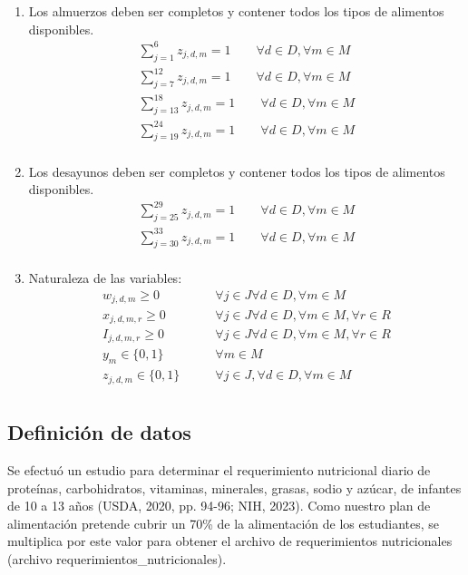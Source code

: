 \documentclass[letterpaper]{article}
\begin{document}
\begin{enumerate}
\begin{equation*}
        \end{equation*}
    \item Los almuerzos deben ser completos y contener todos los tipos de alimentos disponibles.
        \begin{align*}
            \sum_{j = 1}^{6} z_{j,d,m} = 1 \qquad \forall d \in D, \forall m \in M \\
             \sum_{j = 7}^{12} z_{j,d,m} = 1 \qquad \forall d \in D, \forall m \in M \\
              \sum_{j = 13}^{18} z_{j,d,m} = 1 \qquad \forall d \in D, \forall m \in M \\
              \sum_{j = 19}^{24} z_{j,d,m} = 1 \qquad \forall d \in D, \forall m \in M \\
        \end{align*}
    \item Los desayunos deben ser completos y contener todos los tipos de alimentos disponibles.
        \begin{align*}
            \sum_{j = 25}^{29} z_{j,d,m} = 1 \qquad \forall d \in D, \forall m \in M \\
            \sum_{j = 30}^{33} z_{j,d,m} = 1  \qquad \forall d \in D, \forall m \in M \\
        \end{align*}
    \item Naturaleza de las variables:
        \begin{align*}
            w_{j,d,m} \geq 0 &\qquad \forall j \in J \forall d \in D, \forall m \in M \\
            x_{j,d,m,r} \geq 0 &\qquad \forall j \in J \forall d \in D, \forall m \in M, \forall r \in R  \\
            I_{j,d,m,r} \geq 0 &\qquad \forall j \in J \forall d \in D, \forall m \in M, \forall r \in R  \\
            y_{m} \in \{0,1\} &\qquad \forall m \in M  \\
            z_{j,d,m} \in \{0,1\} &\qquad \forall j \in J, \forall d \in D, \forall m \in M \\
        \end{align*}
\end{enumerate}

    \subsection{Definición de datos}
    Se efectuó un estudio para determinar el requerimiento nutricional diario de proteínas, carbohidratos, vitaminas, minerales, grasas, sodio y azúcar, de infantes de 10 a 13 años (USDA, 2020, pp. 94-96; NIH, 2023). Como nuestro plan de alimentación pretende cubrir un 70\% de la alimentación de los estudiantes, se multiplica por este valor para obtener el archivo de requerimientos nutricionales (archivo requerimientos\_nutricionales).
    \\
    
\end{document}
